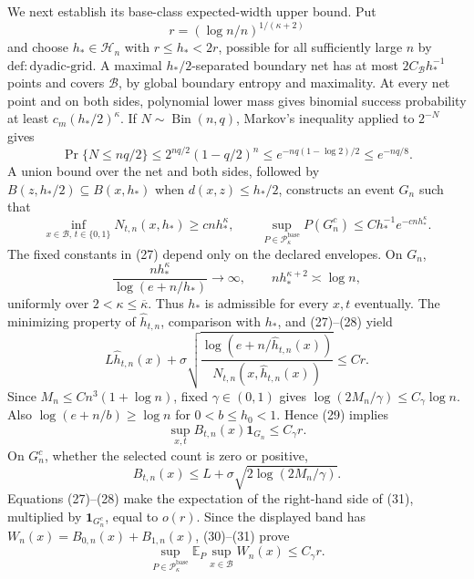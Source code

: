 We next establish its base-class expected-width upper bound. Put
\[
 r=(\log n/n)^{1/(\kappa+2)}
\]
and choose \(h_*\in\mathcal H_n\) with \(r\le h_*<2r\), possible for all sufficiently large \(n\) by \(\mathrm{def:dyadic\text{-}grid}\). A maximal \(h_*/2\)-separated boundary net has at most \(2C_{\mathcal B}h_*^{-1}\) points and covers \(\mathcal B\), by global boundary entropy and maximality. At every net point and on both sides, polynomial lower mass gives binomial success probability at least \(c_m(h_*/2)^\kappa\). If \(N\sim\operatorname{Bin}(n,q)\), Markov's inequality applied to \(2^{-N}\) gives
\[
 \Pr\{N\le nq/2\}
 \le2^{nq/2}(1-q/2)^n
 \le e^{-nq(1-\log2)/2}
 \le e^{-nq/8}. \tag{26}
\]
A union bound over the net and both sides, followed by \(B(z,h_*/2)\subseteq B(x,h_*)\) when \(d(x,z)\le h_*/2\), constructs an event \(G_n\) such that
\[
 \inf_{x\in\mathcal B,\,t\in\{0,1\}}N_{t,n}(x,h_*)
 \ge cnh_*^\kappa,
 \qquad
 \sup_{P\in\mathcal P_{\kappa}^{\mathrm{base}}}P(G_n^c)
 \le Ch_*^{-1}e^{-cnh_*^\kappa}. \tag{27}
\]
The fixed constants in (27) depend only on the declared envelopes. On \(G_n\),
\[
 \frac{nh_*^\kappa}{\log(e+n/h_*)}\longrightarrow\infty,
 \qquad nh_*^{\kappa+2}\asymp\log n, \tag{28}
\]
uniformly over \(2<\kappa\le\overline\kappa\). Thus \(h_*\) is admissible for every \(x,t\) eventually. The minimizing property of \(\widehat h_{t,n}\), comparison with \(h_*\), and (27)--(28) yield
\[
 L\widehat h_{t,n}(x)+
 \sigma\sqrt{\frac{\log(e+n/\widehat h_{t,n}(x))}
 {N_{t,n}(x,\widehat h_{t,n}(x))}}
 \le Cr. \tag{29}
\]
Since \(M_n\le Cn^3(1+\log n)\), fixed \(\gamma\in(0,1)\) gives \(\log(2M_n/\gamma)\le C_\gamma\log n\). Also \(\log(e+n/b)\ge\log n\) for \(0<b\le h_0<1\). Hence (29) implies
\[
 \sup_{x,t}B_{t,n}(x)\mathbf 1_{G_n}\le C_\gamma r. \tag{30}
\]
On \(G_n^c\), whether the selected count is zero or positive,
\[
 B_{t,n}(x)\le L+\sigma\sqrt{2\log(2M_n/\gamma)}. \tag{31}
\]
Equations (27)--(28) make the expectation of the right-hand side of (31), multiplied by \(\mathbf1_{G_n^c}\), equal to \(o(r)\). Since the displayed band has \(W_n(x)=B_{0,n}(x)+B_{1,n}(x)\), (30)--(31) prove
\[
 \sup_{P\in\mathcal P_{\kappa}^{\mathrm{base}}}
 \mathbb E_P\sup_{x\in\mathcal B}W_n(x)
 \le C_\gamma r. \tag{32}
\]

